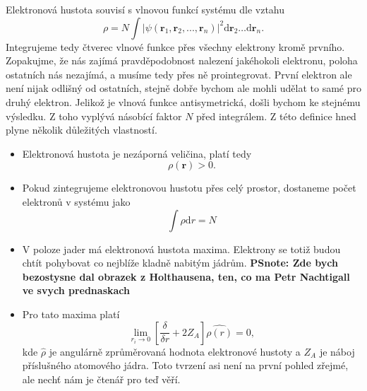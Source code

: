 Elektronová hustota souvisí s vlnovou funkcí systému dle vztahu
\begin{equation}
\rho=N \int |\psi(\textbf{r}_1,\textbf{r}_2,...,\textbf{r}_n)|^2 \mathrm{d}\textbf{r}_2\dots\mathrm{d}\textbf{r}_n .
\label{rov:dft:defrho}
\end{equation}
Integrujeme tedy čtverec vlnové funkce přes všechny elektrony kromě prvního. Zopakujme, že nás zajímá pravděpodobnost nalezení jakéhokoli elektronu, poloha ostatních nás nezajímá, a musíme tedy přes ně prointegrovat. První elektron ale není nijak odlišný od ostatních, stejně dobře bychom ale mohli udělat to samé pro druhý elektron. Jelikož je vlnová funkce antisymetrická, došli bychom ke stejnému výsledku. Z toho vyplývá násobící faktor $N$ před integrálem.
Z této definice hned plyne několik důležitých vlastností.

\begin{itemize}
\item Elektronová hustota je nezáporná veličina, platí tedy
\begin{equation}
\rho(\mathbf{r})  > 0 .
\end{equation}
\item Pokud zintegrujeme elektronovou hustotu přes celý prostor, dostaneme počet elektronů v systému jako
\begin{equation}
\int \rho\mathrm{d}r = N
\end{equation}

\item V poloze jader má elektronová hustota maxima. Elektrony se totiž budou chtít pohybovat co nejblíže kladně nabitým jádrům. 
\textbf{PSnote: Zde bych bezostysne dal obrazek z Holthausena, ten, co ma Petr Nachtigall ve svych prednaskach}
\item Pro tato maxima platí
\begin{equation}
\lim_{r_i \to 0} \left[ \frac{\delta}{\delta r}+2Z_A\right]\hat{\rho(r)}=0, 
\end{equation}
kde $\hat{\rho}$ je angulárně zprůměrovaná hodnota elektronové hustoty a $Z_A$ je náboj příslušného atomového jádra. Toto tvrzení asi není na první pohled zřejmé, ale nechť nám je čtenář pro teď věří.
\end{itemize}

